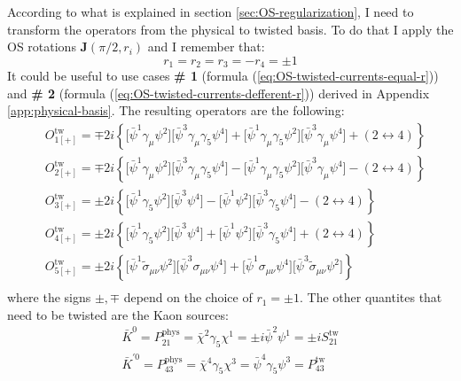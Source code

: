 \documentclass[english, LaM, oneside, noexaminfo]{sapthesis}
\begin{document}
According to what is explained in section \ref{sec:OS-regularization}, I need to transform the operators from the physical to twisted basis.
To do that I apply the OS rotations $\mathbf{J}(\pi/2,r_i)$ and I remember that:
\begin{equation*}
    r_1 = r_2 = r_3 = - r_4 = \pm 1
\end{equation*}
It could be useful to use cases {\bf \# 1} (formula (\ref{eq:OS-twisted-currents-equal-r})) and {\bf \# 2} (formula (\ref{eq:OS-twisted-currents-defferent-r})) derived in Appendix \ref{app:physical-basis}.
The resulting operators are the following:
\begin{equation}\label{eq:O_i-operators-twisted-final}
    \begin{split}
        & O_{1[+]}^\text{tw} = \mp 2i \left\{\big[\bar\psi^1 \gamma_\mu \psi^2 \big] \big[\bar\psi^3 \gamma_\mu \gamma_5 \psi^4 \big] + \big[ \bar\psi^1 \gamma_\mu \gamma_5 \psi^2 \big] \big[ \bar\psi^3 \gamma_\mu \psi^4 \big] + \left(2\leftrightarrow 4\right)\right\} \\
        & O_{2[+]}^\text{tw} = \mp 2i \left\{\big[\bar\psi^1 \gamma_\mu \psi^2 \big] \big[\bar\psi^3 \gamma_\mu \gamma_5 \psi^4 \big] - \big[ \bar\psi^1 \gamma_\mu \gamma_5 \psi^2 \big] \big[ \bar\psi^3 \gamma_\mu \psi^4 \big] - \left(2\leftrightarrow 4\right)\right\} \\
        & O_{3[+]}^\text{tw} = \pm 2i \left\{\big[\bar\psi^1 \gamma_5 \psi^2 \big] \big[ \bar\psi^3 \psi^4 \big] - \big[ \bar\psi^1 \psi^2 \big] \big[ \bar\psi^3 \gamma_5 \psi^4\big] - \left(2\leftrightarrow 4\right)\right\} \\
        & O_{4[+]}^\text{tw} = \pm 2i \left\{\big[\bar\psi^1 \gamma_5 \psi^2 \big] \big[ \bar\psi^3 \psi^4 \big] + \big[ \bar\psi^1 \psi^2 \big] \big[ \bar\psi^3 \gamma_5 \psi^4\big] + \left(2\leftrightarrow 4\right)\right\} \\
        & O_{5[+]}^\text{tw} = \pm 2i \left\{\big[\bar\psi^1 \tilde\sigma_{\mu\nu} \psi^2 \big] \big[ \bar\psi^3 \sigma_{\mu\nu} \psi^4 \big] + \big[\bar\psi^1 \sigma_{\mu\nu} \psi^4 \big] \big[ \bar\psi^3 \tilde\sigma_{\mu\nu} \psi^2 \big] \right\} \\
    \end{split}
\end{equation}
where the signs $\pm,\mp$ depend on the choice of $r_1=\pm1$.
The other quantites that need to be twisted are the Kaon sources:
\begin{equation*}
    \begin{gathered}
        \bar K^{0} = P^\text{phys}_{21} = \bar\chi^2 \gamma_5 \chi^1 = \pm i \bar\psi^2 \psi^1 = \pm i S^\text{tw}_{21} \\
        \bar K^{'0} = P^\text{phys}_{43} = \bar\chi^4 \gamma_5 \chi^3 = \bar\psi^4 \gamma_5 \psi^3 = P^\text{tw}_{43} \\
    \end{gathered}
\end{equation*}
\end{document}
